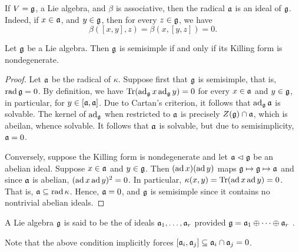 \begin{remark}
    If $V = \mathfrak{g}$, a Lie algebra, and $\beta$ is associative, then the radical $\mathfrak{a}$ is an ideal of $\mathfrak{g}$. Indeed, if $x\in\mathfrak{a}$, and $y\in\mathfrak{g}$, then for every $z\in\mathfrak{g}$, we have 
    \begin{equation*}
        \beta([x, y], z) = \beta(x, [y, z]) = 0.
    \end{equation*}
\end{remark}

\begin{theorem}
    Let $\mathfrak{g}$ be a Lie algebra. Then $\mathfrak{g}$ is semisimple if and only if its Killing form is nondegenerate.
\end{theorem}
\begin{proof}
    Let $\mathfrak{a}$ be the radical of $\kappa$. Suppose first that $\mathfrak{g}$ is semisimple, that is, $\operatorname{rad}\mathfrak{g} = 0$. By definition, we have $\operatorname{Tr}(\operatorname{ad}_{\mathfrak{g}} x\operatorname{ad}_{\mathfrak{g}} y) = 0$ for every $x\in\mathfrak{a}$ and $y\in\mathfrak{g}$, in particular, for $y\in[\mathfrak{a},\mathfrak{a}]$. Due to Cartan's criterion, it follows that $\operatorname{ad}_{\mathfrak{g}}\mathfrak{a}$ is solvable. The kernel of $\operatorname{ad}_{\mathfrak{g}}$ when restricted to $\mathfrak{a}$ is precisely $Z(\mathfrak{g})\cap\mathfrak{a}$, which is abeilan, whence solvable. It follows that $\mathfrak{a}$ is solvable, but due to semisimplicity, $\mathfrak{a} = 0$.

    Conversely, suppose the Killing form is nondegenerate and let $\mathfrak{a}\vartriangleleft\mathfrak{g}$ be an abelian ideal. Suppose $x\in\mathfrak{a}$ and $y\in\mathfrak{g}$. Then $(\operatorname{ad} x)(\operatorname{ad} y)$ maps $\mathfrak{g}\mapsto\mathfrak{g}\mapsto\mathfrak{a}$ and since $\mathfrak{a}$ is abelian, $(\operatorname{ad} x\operatorname{ad} y)^2 = 0$. In particular, $\kappa(x, y) = \operatorname{Tr}(\operatorname{ad} x\operatorname{ad} y) = 0$. That is, $\mathfrak{a}\subseteq\operatorname{rad}\kappa$. Hence, $\mathfrak{a} = 0$, and $\mathfrak{g}$ is semisimple since it contains no nontrivial abelian ideals.
\end{proof}

\begin{definition}
    A Lie algebra $\mathfrak{g}$ is said to be the  of ideals $\mathfrak{a}_1,\dots,\mathfrak{a}_r$ provided $\mathfrak{g} = \mathfrak{a}_1\oplus\dots\oplus\mathfrak{a}_r$ .
\end{definition}

\begin{remark}
    Note that the above condition implicitly forces $[\mathfrak{a}_i,\mathfrak{a}_j]\subseteq\mathfrak{a}_i\cap\mathfrak{a}_j = 0$.
\end{remark}

